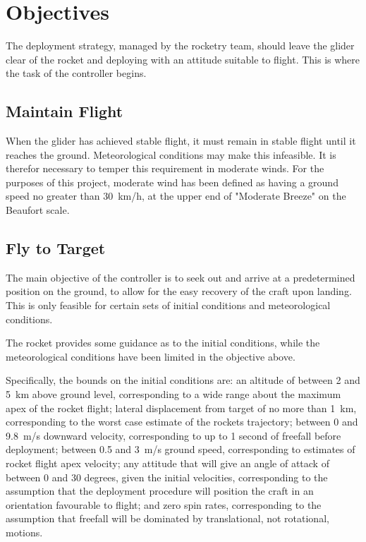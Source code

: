 \documentclass{sydeStyle}
\begin{document}
\chapter{Objectives}

The deployment strategy, managed by the rocketry team, should leave the glider
clear of the rocket and deploying with an attitude suitable to flight. This is
where the task of the controller begins.

\section{Maintain Flight}

When the glider has achieved stable flight, it must remain in stable flight
until it reaches the ground. Meteorological conditions may make this infeasible.
It is therefor necessary to temper this requirement in moderate winds. For the
purposes of this project, moderate wind has been defined as having a ground
speed no greater than 30~km/h, at the upper end of "Moderate Breeze" on the
Beaufort scale\cite{wiki:beaufort}.

\section{Fly to Target}

The main objective of the controller is to seek out and arrive at a
predetermined position on the ground, to allow for the easy recovery of the
craft upon landing. This is only feasible for certain sets of initial conditions
and meteorological conditions.

The rocket provides some guidance as to the initial conditions, while the
meteorological conditions have been limited in the objective above.

Specifically, the bounds on the initial conditions are: an altitude of between
2 and 5~km above ground level, corresponding to a wide range about the maximum
apex of the rocket flight; lateral displacement from target of no more than
1~km, corresponding to the worst case estimate of the rockets trajectory;
between 0 and 9.8~m/s downward velocity, corresponding to up to 1 second of
freefall before deployment; between 0.5 and 3~m/s ground speed, corresponding
to estimates of rocket flight apex velocity; any attitude that will give an
angle of attack of between 0 and 30 degrees, given the initial velocities,
corresponding to the assumption that the deployment procedure will position the
craft in an orientation favourable to flight; and zero spin rates,
corresponding to the assumption that freefall will be dominated by
translational, not rotational, motions.
\end{document}
